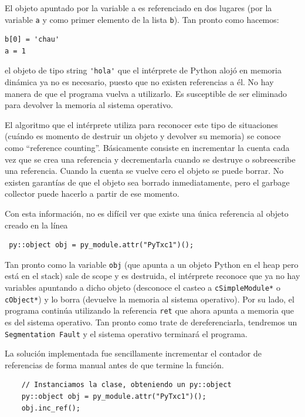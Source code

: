 \documentclass[]{article}
\begin{document}
El objeto apuntado por la variable a es referenciado en dos lugares (por la
variable \verb!a! y como primer elemento de la lista \verb!b!). Tan pronto como
hacemos:

\begin{verbatim}
b[0] = 'chau'
a = 1
\end{verbatim}

\noindent el objeto de tipo string \verb!'hola'! que el intérprete de Python
alojó en memoria dinámica ya no es necesario, puesto que no existen referencias
a él. No hay manera de que el programa vuelva a utilizarlo. Es susceptible de
ser eliminado para devolver la memoria al sistema operativo.

El algoritmo que el intérprete utiliza para reconocer este tipo de situaciones
(cuándo es momento de destruir un objeto y devolver su memoria) se conoce como
``reference counting''. Básicamente consiste en incrementar la cuenta cada vez
que se crea una referencia y decrementarla cuando se destruye o sobreescribe
una referencia. Cuando la cuenta se vuelve cero el objeto se puede borrar. No
existen garantías de que el objeto sea borrado inmediatamente, pero el garbage
collector puede hacerlo a partir de ese momento.

Con esta información, no es difícil ver que existe una única referencia al
objeto creado en la línea

\begin{verbatim}
 py::object obj = py_module.attr("PyTxc1")();
\end{verbatim}

Tan pronto como la variable \verb!obj! (que apunta a un objeto Python en el
heap pero está en el stack) sale de scope y es destruida, el intérprete
reconoce que ya no hay variables apuntando a dicho objeto (desconoce el casteo
a \verb!cSimpleModule*! o \verb!cObject*!) y lo borra (devuelve la memoria al
sistema operativo). Por su lado, el programa \omnetpp{} continúa utilizando la
referencia \verb!ret! que ahora apunta a memoria que es del sistema operativo.
Tan pronto como trate de dereferenciarla, tendremos un \verb!Segmentation Fault!
y el sistema operativo terminará el programa.

La solución implementada fue sencillamente incrementar el contador de
referencias de forma manual antes de que termine la función. 

\begin{verbatim}
    // Instanciamos la clase, obteniendo un py::object
    py::object obj = py_module.attr("PyTxc1")();
    obj.inc_ref();
\end{verbatim}
\end{document}
